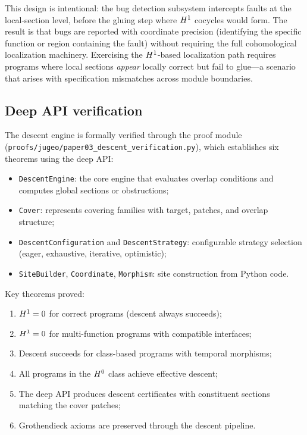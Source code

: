 \documentclass[11pt]{article}
\begin{document}
This design is intentional: the bug detection subsystem intercepts faults
at the local-section level, before the gluing step where $H^{1}$
cocycles would form.  The result is that bugs are reported with coordinate
precision (identifying the specific function or region containing the
fault) without requiring the full cohomological localization machinery.
Exercising the $H^{1}$-based localization path requires programs where
local sections \emph{appear} locally correct but fail to glue---a scenario
that arises with specification mismatches across module boundaries.

\subsection{Deep API verification}\label{ssec:deep-api}

The descent engine is formally verified through the \JuGeo{} proof module
(\texttt{proofs/jugeo/paper03\_descent\_verification.py}), which
establishes six theorems using the deep API:

\begin{itemize}[nosep]
  \item \texttt{DescentEngine}: the core engine that evaluates overlap
        conditions and computes global sections or obstructions;
  \item \texttt{Cover}: represents covering families with target, patches,
        and overlap structure;
  \item \texttt{DescentConfiguration} and \texttt{DescentStrategy}:
        configurable strategy selection (eager, exhaustive, iterative,
        optimistic);
  \item \texttt{SiteBuilder}, \texttt{Coordinate}, \texttt{Morphism}:
        site construction from Python code.
\end{itemize}

Key theorems proved:
\begin{enumerate}[nosep]
  \item $H^{1} = 0$ for correct programs (descent always succeeds);
  \item $H^{1} = 0$ for multi-function programs with compatible interfaces;
  \item Descent succeeds for class-based programs with temporal morphisms;
  \item All programs in the $H^{0}$ class achieve effective descent;
  \item The deep API produces descent certificates with constituent sections
        matching the cover patches;
  \item Grothendieck axioms are preserved through the descent pipeline.
\end{enumerate}
\end{document}
